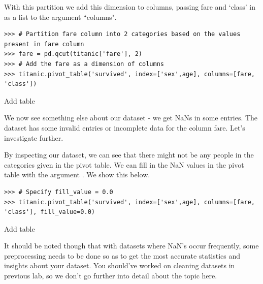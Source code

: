 With this partition we add this dimension to columns, passing fare and `class' in as a list to the argument ``columns".

\begin{lstlisting}
>>> # Partition fare column into 2 categories based on the values present in fare column
>>> fare = pd.qcut(titanic['fare'], 2)
>>> # Add the fare as a dimension of columns
>>> titanic.pivot_table('survived', index=['sex',age], columns=[fare, 'class'])
\end{lstlisting}

Add table

We now see something else about our dataset - we get NaNs in some entries. The dataset has some invalid entries or incomplete data for the column fare. Let's investigate further.

By inspecting our dataset, we can see that there might not be any people in the categories given in the pivot table. We can fill in the NaN values in the pivot table with the argument . We show this below.

\begin{lstlisting}
>>> # Specify fill_value = 0.0
>>> titanic.pivot_table('survived', index=['sex',age], columns=[fare, 'class'], fill_value=0.0)
\end{lstlisting}

Add table

It should be noted though that with datasets where NaN's occur frequently, some preprocessing needs to be done so as to get the most accurate statistics and insights about your dataset. You should've worked on cleaning datasets in previous lab, so we don't go further into detail about the topic here.


